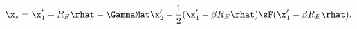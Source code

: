 \begin{equation}
\label{eq:backgroundorder3}
\x_s= \x'_1 - R_E\rhat -  \GammaMat\x'_2 - \frac{1}{2}(\x'_1 - \beta R_E\rhat) \sF (\x'_1 - \beta R_E \rhat).
\end{equation}